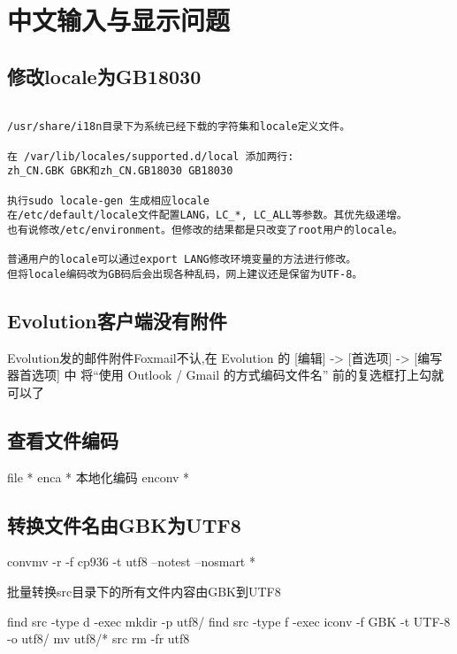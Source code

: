 \section{中文输入与显示问题}

\subsection{修改locale为GB18030}

\begin{verbatim}

/usr/share/i18n目录下为系统已经下载的字符集和locale定义文件。

在 /var/lib/locales/supported.d/local 添加两行:
zh_CN.GBK GBK和zh_CN.GB18030 GB18030 

执行sudo locale-gen 生成相应locale
在/etc/default/locale文件配置LANG，LC_*, LC_ALL等参数。其优先级递增。
也有说修改/etc/environment。但修改的结果都是只改变了root用户的locale。

普通用户的locale可以通过export LANG修改环境变量的方法进行修改。
但将locale编码改为GB码后会出现各种乱码，网上建议还是保留为UTF-8。

\end{verbatim}




\subsection{Evolution客户端没有附件}
Evolution发的邮件附件Foxmail不认,在 Evolution 的 [编辑] -> [首选项] -> [编写器首选项] 中
将“使用 Outlook / Gmail 的方式编码文件名” 前的复选框打上勾就可以了

\subsection{查看文件编码}
\begin{shellcmd}
file *
enca *
本地化编码 enconv *
\end{shellcmd}

\subsection{转换文件名由GBK为UTF8}
\begin{shellcmd}
convmv -r -f cp936 -t utf8 --notest --nosmart *
\end{shellcmd}

批量转换src目录下的所有文件内容由GBK到UTF8
\begin{shellcmd}
find src -type d -exec mkdir -p utf8/{} \;
find src -type f -exec iconv -f GBK -t UTF-8 {} -o utf8/{} \;
mv utf8/* src
rm -fr utf8
\end{shellcmd}

